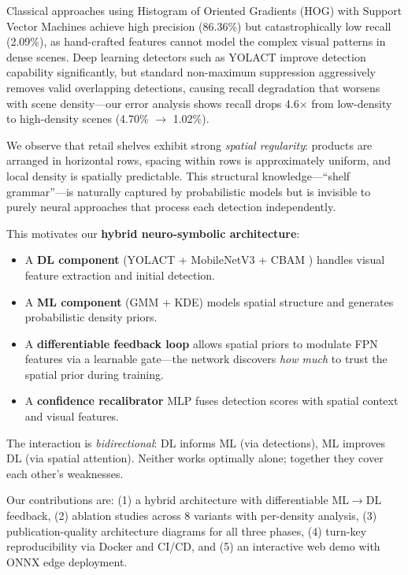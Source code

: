 \documentclass[conference]{IEEEtran}
\begin{document}
Classical approaches using Histogram of Oriented Gradients (HOG) \cite{dalal2005hog} with Support Vector Machines achieve high precision (86.36\%) but catastrophically low recall (2.09\%), as hand-crafted features cannot model the complex visual patterns in dense scenes. Deep learning detectors such as YOLACT \cite{bolya2019yolact} improve detection capability significantly, but standard non-maximum suppression aggressively removes valid overlapping detections, causing recall degradation that worsens with scene density---our error analysis shows recall drops 4.6$\times$ from low-density to high-density scenes (4.70\% $\rightarrow$ 1.02\%).

We observe that retail shelves exhibit strong \emph{spatial regularity}: products are arranged in horizontal rows, spacing within rows is approximately uniform, and local density is spatially predictable. This structural knowledge---``shelf grammar''---is naturally captured by probabilistic models but is invisible to purely neural approaches that process each detection independently.

This motivates our \textbf{hybrid neuro-symbolic architecture}:
\begin{itemize}
    \item A \textbf{DL component} (YOLACT + MobileNetV3 \cite{howard2019mobilenetv3} + CBAM \cite{woo2018cbam}) handles visual feature extraction and initial detection.
    \item A \textbf{ML component} (GMM + KDE) models spatial structure and generates probabilistic density priors.
    \item A \textbf{differentiable feedback loop} allows spatial priors to modulate FPN features via a learnable gate---the network discovers \emph{how much} to trust the spatial prior during training.
    \item A \textbf{confidence recalibrator} MLP fuses detection scores with spatial context and visual features.
\end{itemize}

The interaction is \emph{bidirectional}: DL informs ML (via detections), ML improves DL (via spatial attention). Neither works optimally alone; together they cover each other's weaknesses.

Our contributions are: (1) a hybrid architecture with differentiable ML$\rightarrow$DL feedback, (2) ablation studies across 8 variants with per-density analysis, (3) publication-quality architecture diagrams for all three phases, (4) turn-key reproducibility via Docker and CI/CD, and (5) an interactive web demo with ONNX edge deployment.
\end{document}

